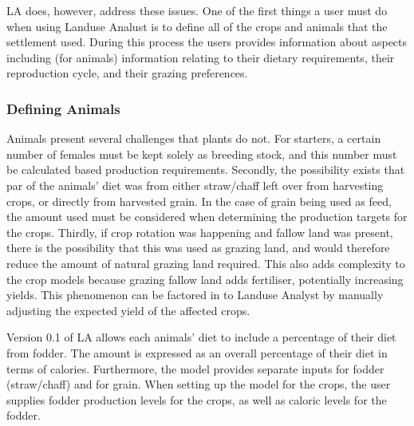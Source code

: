 LA does, however, address these issues.  One of the first things a user must do when using Landuse Analust is to define all of the crops and animals that the settlement used.  During this process the users provides information about aspects including (for animals) information
relating to their dietary requirements, their reproduction cycle, and their grazing preferences.

\subsubsection{Defining Animals}
  \label{definingAnimals}
Animals present several challenges that plants do not.  For starters, a certain
number of females must be kept solely as breeding stock, and this number must be
calculated based production requirements.  Secondly, the possibility exists that
par of the animals' diet was from either straw/chaff left over from harvesting
crops, or directly from harvested grain.  In the case of grain being used as
feed, the amount used must be considered when determining the production targets
for the crops.  Thirdly, if crop rotation was happening and fallow land was
present, there is the possibility that this was used as grazing land, and would
therefore reduce the amount of natural grazing land required.  This also adds
complexity to the crop models because grazing fallow land adds fertiliser,
potentially increasing yields.  This phenomenon can be factored in to Landuse
Analyst by manually adjusting the expected yield of the affected crops.

Version 0.1 of LA allows each animals' diet to include a percentage
of their diet from fodder.  The amount is expressed as an overall percentage of
their diet in terms of calories.  Furthermore, the model provides separate
inputs for fodder (straw/chaff) and for grain.  When setting up the model for
the crops, the user supplies fodder production levels for the crops, as well as
caloric levels for the fodder.

